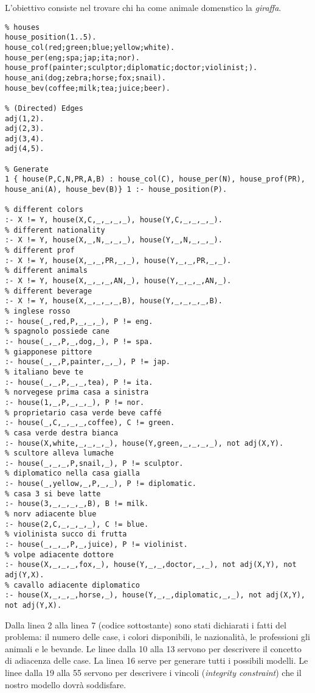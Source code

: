 L'obiettivo consiste nel trovare chi ha come animale domenstico la \emph{giraffa}.

\begin{lstlisting}
% houses
house_position(1..5).
house_col(red;green;blue;yellow;white).
house_per(eng;spa;jap;ita;nor).
house_prof(painter;sculptor;diplomatic;doctor;violinist;).
house_ani(dog;zebra;horse;fox;snail).
house_bev(coffee;milk;tea;juice;beer).

% (Directed) Edges
adj(1,2).
adj(2,3).
adj(3,4).
adj(4,5).

% Generate
1 { house(P,C,N,PR,A,B) : house_col(C), house_per(N), house_prof(PR), house_ani(A), house_bev(B)} 1 :- house_position(P).

% different colors
:- X != Y, house(X,C,_,_,_,_), house(Y,C,_,_,_,_).
% different nationality
:- X != Y, house(X,_,N,_,_,_), house(Y,_,N,_,_,_).
% different prof
:- X != Y, house(X,_,_,PR,_,_), house(Y,_,_,PR,_,_).
% different animals
:- X != Y, house(X,_,_,_,AN,_), house(Y,_,_,_,AN,_).
% different beverage
:- X != Y, house(X,_,_,_,_,B), house(Y,_,_,_,_,B).
% inglese rosso
:- house(_,red,P,_,_,_), P != eng.
% spagnolo possiede cane
:- house(_,_,P,_,dog,_), P != spa.
% giapponese pittore
:- house(_,_,P,painter,_,_), P != jap.
% italiano beve te
:- house(_,_,P,_,_,tea), P != ita.
% norvegese prima casa a sinistra
:- house(1,_,P,_,_,_), P != nor.
% proprietario casa verde beve caffé
:- house(_,C,_,_,_,coffee), C != green.
% casa verde destra bianca
:- house(X,white,_,_,_,_), house(Y,green,_,_,_,_), not adj(X,Y).
% scultore alleva lumache
:- house(_,_,_,P,snail,_), P != sculptor.
% diplomatico nella casa gialla
:- house(_,yellow,_,P,_,_), P != diplomatic.
% casa 3 si beve latte
:- house(3,_,_,_,_,B), B != milk.
% norv adiacente blue
:- house(2,C,_,_,_,_), C != blue.
% violinista succo di frutta
:- house(_,_,_,P,_,juice), P != violinist.
% volpe adiacente dottore
:- house(X,_,_,_,fox,_), house(Y,_,_,doctor,_,_), not adj(X,Y), not adj(Y,X).
% cavallo adiacente diplomatico
:- house(X,_,_,_,horse,_), house(Y,_,_,diplomatic,_,_), not adj(X,Y), not adj(Y,X).
\end{lstlisting}


Dalla linea 2 alla linea 7 (codice sottostante) sono stati dichiarati i fatti del problema: il numero delle case, i colori disponibili, le nazionalità, le professioni
gli animali e le bevande. Le linee dalla 10 alla 13 servono per descrivere il concetto di adiacenza delle case. La linea 16 serve per generare tutti i possibili modelli. Le linee dalla 19 alla 55 servono per descrivere i vincoli (\emph{integrity constraint}) che il nostro modello dovrà soddisfare.


